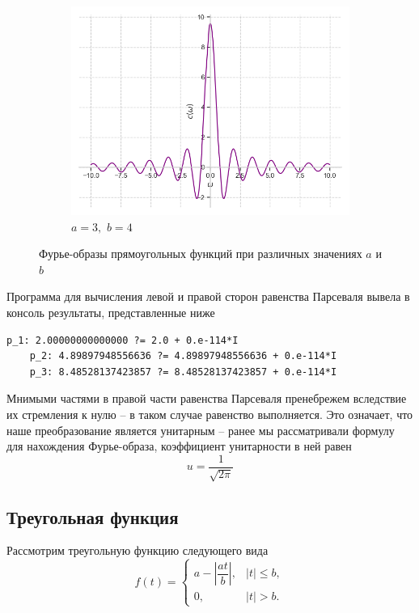 \documentclass[a4paper, 16pt]{article}
\begin{document}
\begin{figure}[htbp]
\begin{subfigure}{0.3\textwidth}
        \end{subfigure}
        \hfill
        \begin{subfigure}{0.3\textwidth}
            \centering
            \includegraphics[width=\linewidth]{rectfimg_a=3_b=4.png}
            \caption{$a=3,\,\,b=4$}
            \label{fig:rectfimg_3}
        \end{subfigure}
        \caption{Фурье-образы прямоугольных функций при различных значениях $a$ и $b$}
        \label{fig:rectfimgs}
    \end{figure}


    \noindent Программа для вычисления левой и правой сторон равенства Парсеваля вывела в консоль результаты, представленные ниже
    \begin{lstlisting}[label=pres_rectf, caption=Результат выполнения программы для вычисления равенства Парсеваля]
    p_1: 2.00000000000000 ?= 2.0 + 0.e-114*I  
    p_2: 4.89897948556636 ?= 4.89897948556636 + 0.e-114*I 
    p_3: 8.48528137423857 ?= 8.48528137423857 + 0.e-114*I
    \end{lstlisting}


    \noindent Мнимыми частями в правой части равенства Парсеваля пренебрежем вследствие их стремления к нулю -- в таком случае равенство выполняется.
    Это означает, что наше преобразование является унитарным -- ранее мы рассматривали формулу для нахождения Фурье-образа, коэффициент унитарности в ней равен
    $$
    u=\dfrac{1}{\sqrt{2\pi}}
    $$


    \subsection{Треугольная функция}
    \noindent Рассмотрим треугольную функцию следующего вида
    $$
    f(t)=
    \begin{cases}
        a-\left|\dfrac{at}{b}\right|, & \left|t\right|\leq b,\\
        0, & \left|t\right|>b.
    \end{cases}
    $$
\end{document}
